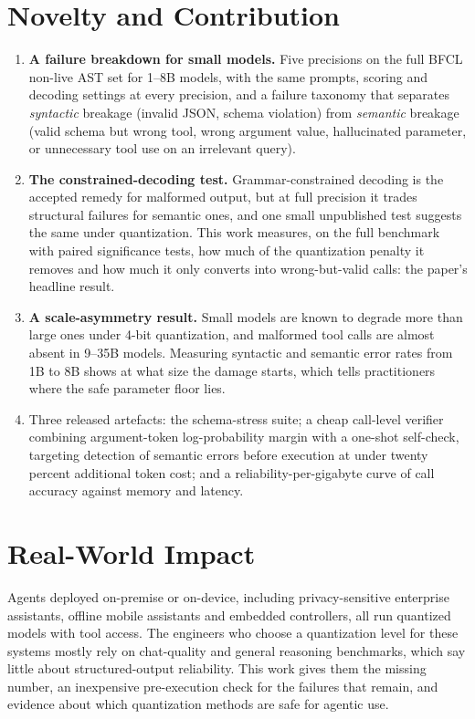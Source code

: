\documentclass[12pt,a4paper]{article}
\begin{document}
\section*{Novelty and Contribution}

\begin{enumerate}
  \item \textbf{A failure breakdown for small models.} Five precisions on the full BFCL non-live
        AST set for 1--8B models, with the same prompts, scoring and decoding settings at
        every precision, and a failure taxonomy that separates \emph{syntactic} breakage (invalid
        JSON, schema violation) from \emph{semantic} breakage (valid schema but wrong tool, wrong
        argument value, hallucinated parameter, or unnecessary tool use on an irrelevant query).
  \item \textbf{The constrained-decoding test.} Grammar-constrained decoding is the accepted remedy
        for malformed output, but at full precision it trades structural failures for semantic ones,
        and one small unpublished test suggests the same under quantization. This work measures, on
        the full benchmark with paired significance tests, how much of the quantization penalty it
        removes and how much it only converts into wrong-but-valid calls: the paper's headline result.
  \item \textbf{A scale-asymmetry result.} Small models are known to degrade more than large ones
        under 4-bit quantization, and malformed tool calls are almost absent in 9--35B models.
        Measuring syntactic and semantic error rates from 1B to 8B shows at what size the damage
        starts, which tells practitioners where the safe parameter floor lies.
  \item Three released artefacts: the schema-stress suite; a cheap call-level verifier combining
        argument-token log-probability margin with a one-shot self-check, targeting detection of
        semantic errors before execution at under twenty percent additional token cost; and a
        reliability-per-gigabyte curve of call accuracy against memory and latency.
\end{enumerate}

\section*{Real-World Impact}

Agents deployed on-premise or on-device, including privacy-sensitive enterprise assistants, offline
mobile assistants and embedded controllers, all run quantized models with tool access. The engineers
who choose a quantization level for these systems mostly rely on chat-quality and general
reasoning benchmarks, which say little about structured-output reliability. This work gives them
the missing number, an inexpensive pre-execution check for the failures that remain, and evidence
about which quantization methods are safe for agentic use.
\end{document}
